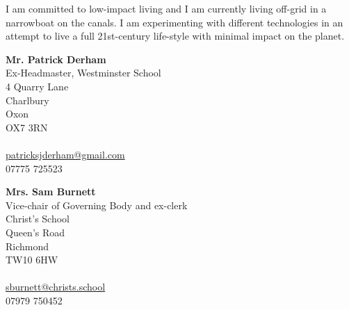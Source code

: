 \documentclass[11pt, a4paper]{awesome-cv}
\begin{document}
\begin{cvparagraph}
  I am committed to low-impact living and I am currently living off-grid in a narrowboat on the canals. I am experimenting with different technologies in an attempt to live a full 21st-century life-style with minimal impact on the planet.
\end{cvparagraph}


\begin{minipage}[t]{0.5\textwidth}
\textbf{Mr. Patrick Derham}\\
Ex-Headmaster, Westminster School\\
4 Quarry Lane\\
Charlbury\\
Oxon\\
OX7 3RN\\
\\
\href{mailto:patricksjderham@gmail.com}{patricksjderham@gmail.com}\\
07775 725523\\
\end{minipage}
\begin{minipage}[t]{0.5\textwidth}
\textbf{Mrs. Sam Burnett}\\
Vice-chair of Governing Body and ex-clerk\\
Christ's School\\
Queen's Road\\
Richmond\\
TW10 6HW\\
\\
\href{mailto:sburnett@christs.school}{sburnett@christs.school}\\
07979 750452\\
\end{minipage}
\end{document}
